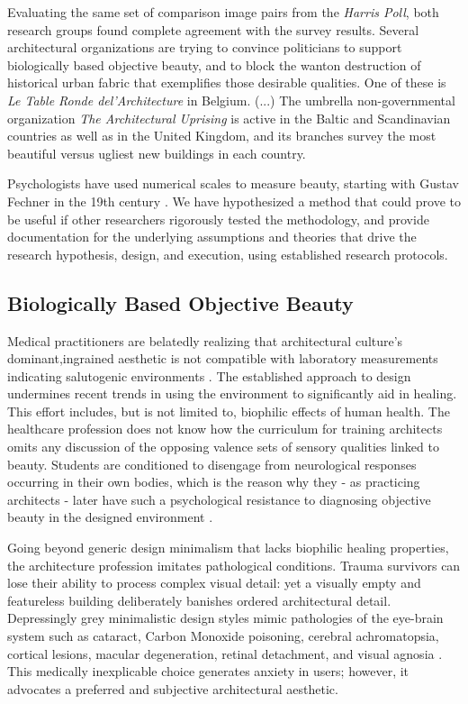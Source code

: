 \documentclass[a4paper]{article}
\begin{document}
Evaluating the same set of comparison image pairs from the \textit{Harris Poll}, both research groups found complete agreement with the survey results. Several architectural organizations are trying to convince politicians to support biologically based objective beauty, and to block the wanton destruction of historical urban fabric that exemplifies those desirable qualities. One of these is \textit{Le Table Ronde del'Architecture} in Belgium. (...) The umbrella non-governmental organization \textit{The Architectural Uprising} is active in the Baltic and Scandinavian countries as well as in the United Kingdom, and its branches survey the most beautiful versus ugliest new buildings in each country.

Psychologists have used numerical scales to measure beauty, starting with Gustav Fechner in the 19th century \cite{brielmann_intense_2019}. We have hypothesized a method that could prove to be useful if other researchers rigorously tested the methodology, and provide documentation for the underlying assumptions and theories that drive the research hypothesis, design, and execution, using established research protocols.

\subsection{Biologically Based Objective Beauty}

Medical practitioners are belatedly realizing that architectural culture’s dominant,ingrained aesthetic is not compatible with laboratory measurements indicating salutogenic environments \cite{seresinhe_using_2017,seresinhe_quantifying_2015,bates_humanizing_2018,mittelmark_handbook_2017,golembiewski_designed_2016,inalhan_start_2010}. The established approach to design undermines recent trends in using the environment to significantly aid in healing. This effort includes, but is not limited to, biophilic effects of human health. The healthcare profession does not know how the curriculum for training architects omits any discussion of the opposing valence sets of sensory qualities linked to beauty. Students are conditioned to disengage from neurological responses occurring in their own bodies, which is the reason why they - as practicing architects - later have such a psychological resistance to diagnosing objective beauty in the designed environment \cite{salingaros_what_2017}.

Going beyond generic design minimalism that lacks biophilic healing properties, the architecture profession imitates pathological conditions. Trauma survivors can lose their ability to process complex visual detail: yet a visually empty and featureless building deliberately banishes ordered architectural detail. Depressingly grey minimalistic design styles mimic pathologies of the eye-brain system such as cataract, Carbon Monoxide poisoning, cerebral achromatopsia, cortical lesions, macular degeneration, retinal detachment, and visual agnosia \cite[Chapter 4]{salingaros_theory_2008}. This medically inexplicable choice generates anxiety in users; however, it advocates a preferred and subjective architectural aesthetic.
\end{document}
